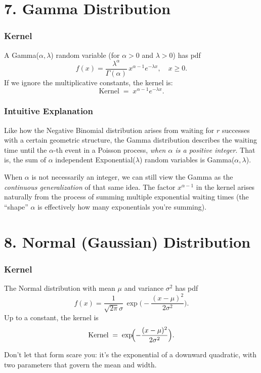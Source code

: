 \documentclass{article}
\begin{document}
\section*{7. Gamma Distribution}

\subsubsection*{Kernel}
A Gamma(\(\alpha, \lambda\)) random variable (for \(\alpha > 0\) and \(\lambda>0\)) has pdf
\[
f(x) = \frac{\lambda^\alpha}{\Gamma(\alpha)}\, x^{\alpha - 1} e^{-\lambda x}, \quad x \ge 0.
\]
If we ignore the multiplicative constants, the kernel is:
\[
\text{Kernel} \;=\; x^{\alpha - 1} e^{-\lambda x}.
\]

\subsubsection*{Intuitive Explanation}
Like how the Negative Binomial distribution arises from waiting for \(r\) successes with a certain geometric structure, the Gamma distribution describes the waiting time until the \(\alpha\)-th event in a Poisson process, \emph{when \(\alpha\) is a positive integer}. 
That is, the sum of \(\alpha\) independent Exponential(\(\lambda\)) random variables is Gamma(\(\alpha,\lambda\)). 

When \(\alpha\) is not necessarily an integer, we can still view the Gamma as the \emph{continuous generalization} of that same idea. 
The factor \(x^{\alpha-1}\) in the kernel arises naturally from the process of summing multiple exponential waiting times (the ``shape'' \(\alpha\) is effectively how many exponentials you're summing).

\section*{8. Normal (Gaussian) Distribution}

\subsubsection*{Kernel}
The Normal distribution with mean \(\mu\) and variance \(\sigma^2\) has pdf
\[
f(x) = \frac{1}{\sqrt{2\pi}\sigma}\,\exp\!\biggl(-\frac{(x-\mu)^2}{2\sigma^2}\biggr).
\]
Up to a constant, the kernel is
\[
\text{Kernel} \;=\; \exp\!\Bigl(-\frac{(x-\mu)^2}{2\sigma^2}\Bigr).
\]

Don't let that form scare you: it's the exponential of a downward quadratic, with two parameters that govern the mean and width.
\end{document}
